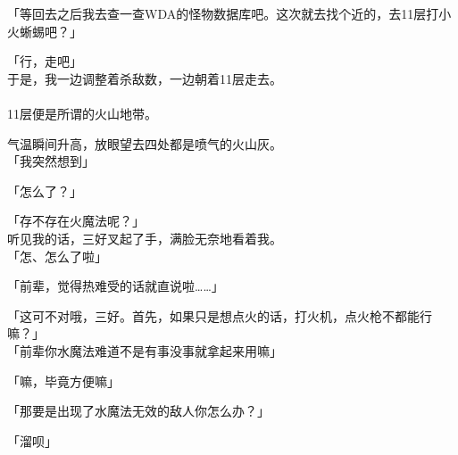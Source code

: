 「等回去之后我去查一查WDA的怪物数据库吧。这次就去找个近的，去11层打小火蜥蜴吧？」

「行，走吧」\\

于是，我一边调整着杀敌数，一边朝着11层走去。\\

\sqsplit\\

11层便是所谓的火山地带。

气温瞬间升高，放眼望去四处都是喷气的火山灰。\\

「我突然想到」

「怎么了？」

「存不存在火魔法呢？」\\

听见我的话，三好叉起了手，满脸无奈地看着我。\\

「怎、怎么了啦」

「前辈，觉得热难受的话就直说啦……」

「这可不对哦，三好。首先，如果只是想点火的话，打火机，点火枪不都能行嘛？」\\

「前辈你水魔法难道不是有事没事就拿起来用嘛」

「嘛，毕竟方便嘛」

「那要是出现了水魔法无效的敌人你怎么办？」

「溜呗」\\

